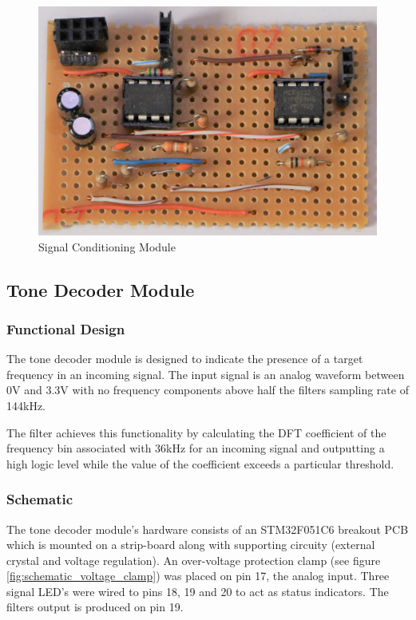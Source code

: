 \begin{figure}[H]
	\centering
	\includegraphics[width=.6\textwidth]{figures/modules/filtering_conditioning.jpg}
	\caption{Signal Conditioning Module}
	\label{fig:module_filtering_conditioning}
\end{figure}





\subsection{Tone Decoder Module}

\subsubsection{Functional Design}
The tone decoder module is designed to indicate the presence of a target frequency in an incoming signal. The input signal is an analog waveform between 0V and 3.3V with no frequency components above half the filters sampling rate of 144kHz.

The filter achieves this functionality by calculating the DFT coefficient of the frequency bin associated with 36kHz for an incoming signal and outputting a high logic level while the value of the coefficient exceeds a particular threshold.

\subsubsection{Schematic}
The tone decoder module's hardware consists of an STM32F051C6 breakout PCB which is mounted on a strip-board along with supporting circuity (external crystal and voltage regulation). An over-voltage protection clamp (see figure \ref{fig:schematic_voltage_clamp}) was placed on pin 17, the analog input. Three signal LED's were wired to pins 18, 19 and 20 to act as status indicators. The filters output is produced on pin 19.

